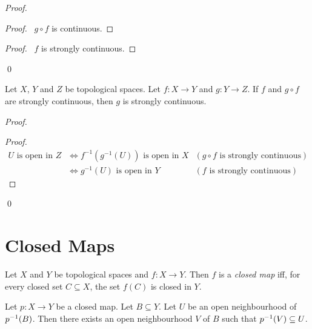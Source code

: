 \begin{proof}
  \pf
  \begin{proof}
    \pf\ $g \circ f$ is continuous.
  \end{proof}
  \begin{proof}
    \pf\ $f$ is strongly continuous.
  \end{proof}
  \qed
\end{proof}

\begin{prop}
  Let $X$, $Y$ and $Z$ be topological spaces. Let $f : X \rightarrow Y$ and
  $g
  : Y \rightarrow Z$. If $f$ and $g \circ f$ are strongly continuous, then
  $g$
  is
  strongly continuous.
\end{prop}

\begin{proof}
  \pf
  \begin{proof}
    \pf
    \begin{align*}
      U \text{ is open in } Z & \Leftrightarrow f^{-1}(g^{-1}(U)) \text{ is
        open in } X & (g \circ f \text{ is strongly continuous}) \\
      & \Leftrightarrow g^{-1}(U) \text{ is open in } Y & (f \text{ is
        strongly continuous})
    \end{align*}
  \end{proof}
  \qed
\end{proof}

\section{Closed Maps}

\begin{df}
  Let $X$ and $Y$ be topological spaces and $f : X \rightarrow Y$. Then $f$
  is
  a \emph{closed map} iff, for every closed set $C \subseteq X$, the
  set $f(C)$ is closed in $Y$.
\end{df}

\begin{lm}
  \label{lm:topology:closed_map:open}
  Let $p : X \rightarrow Y$ be a closed map. Let $B \subseteq Y$. Let $U$ be an open neighbourhood of ${p}^{-1}(B)$. Then there exists an open neighbourhood $V$ of $B$ such that ${p}^{-1}(V) \subseteq U$.
\end{lm}

